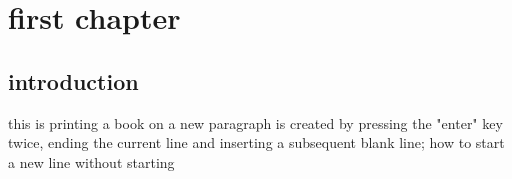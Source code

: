 \documentclass{book}
\begin{document}
	\chapter{ first chapter}
	\section{introduction}
	this is printing a book
	on a new paragraph is created by pressing the "enter" key twice, ending the
	current line and inserting a subsequent blank line;
	how to start a new line without starting
\end{document}
